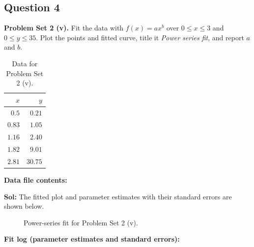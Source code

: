 \documentclass{book}
\begin{document}
\subsection*{Question 4}
\noindent\textbf{Problem Set 2 (v).} Fit the data with $f(x)=ax^b$ over $0\le x\le3$ and $0\le y\le35$. Plot the points and fitted curve, title it \textit{Power series fit}, and report $a$ and $b$.
\begin{table}[H]
\centering
\caption{Data for Problem Set 2 (v).}
\begin{tabular}{|r|r|}
\hline
$x$ & $y$ \\ \hline
$0.5$ & $0.21$ \\ \hline
$0.83$ & $1.05$ \\ \hline
$1.16$ & $2.40$ \\ \hline
$1.82$ & $9.01$ \\ \hline
$2.81$ & $30.75$ \\ \hline
\end{tabular}
\end{table}
\noindent\textbf{Data file contents:}

\noindent\textbf{Sol:} The fitted plot and parameter estimates with their standard errors are shown below.

\begin{figure}[H]
    \centering
    
    \caption{Power-series fit for Problem Set 2 (v).}
\end{figure}
\noindent\textbf{Fit log (parameter estimates and standard errors):}

\newpage
\end{document}

